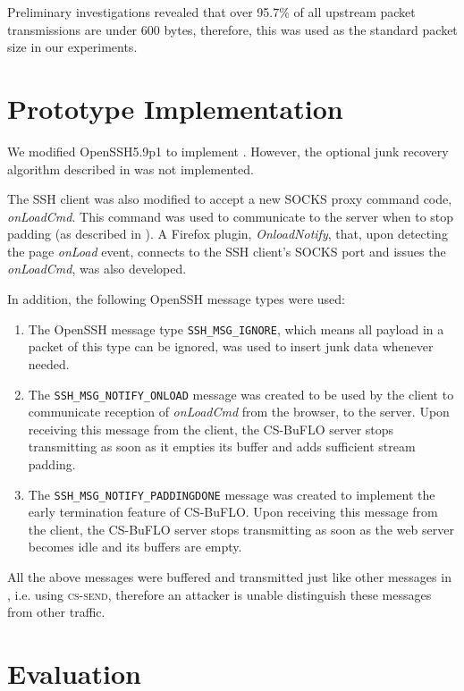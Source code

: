\documentclass[10pt,journal]{IEEEtran}
\newcommand{\csb} {CS-BuFLO\xspace}
\begin{document}
Preliminary investigations revealed that over 95.7\% of all upstream
packet transmissions are under 600 bytes, therefore, this was used
as the standard packet size in our experiments.


\section{Prototype Implementation}
\label{subsec:implementation}

We modified OpenSSH5.9p1 to implement .
However, the optional junk 
recovery algorithm described in  was not implemented.

The SSH client was also modified to accept a new SOCKS proxy command 
code, \textit{onLoadCmd}. This command was used to communicate to the 
server when to stop padding (as described in ).
A Firefox plugin, \textit{OnloadNotify}, that, upon detecting the page 
\textit{onLoad} event, connects to the SSH client's SOCKS port and issues 
the \textit{onLoadCmd}, was also developed. 

In addition, the following OpenSSH message types were used:
\begin{enumerate}
\item The OpenSSH message type \texttt{SSH\_MSG\_IGNORE}, which means 
all payload in a packet of this type can be ignored, was used 
to insert junk data whenever needed.    
\item The \texttt{SSH\_MSG\_NOTIFY\_ONLOAD} message was created to be
used by the client to communicate reception of \textit{onLoadCmd} from 
the browser, to the server. Upon receiving this message from the client,
the \csb server stops transmitting as soon as it empties its buffer and
adds sufficient stream padding.
\item The \texttt{SSH\_MSG\_NOTIFY\_PADDINGDONE} message was created to 
implement the early termination feature of \csb. Upon receiving this message
from the client, the \csb server stops transmitting as soon as the web 
server becomes idle and its buffers are empty.
\end{enumerate}

All the above messages were buffered and transmitted just like other 
messages in , i.e. using \textsc{cs-send}, 
therefore an attacker is unable distinguish these messages from 
other traffic.




\section{Evaluation}
\label{sec:evaluation}
\end{document}
